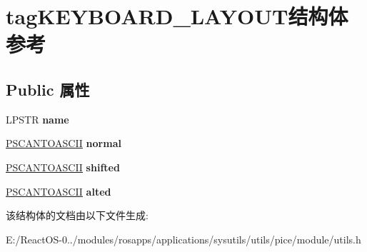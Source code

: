 \hypertarget{structtag_k_e_y_b_o_a_r_d___l_a_y_o_u_t}{}\section{tag\+K\+E\+Y\+B\+O\+A\+R\+D\+\_\+\+L\+A\+Y\+O\+U\+T结构体 参考}
\label{structtag_k_e_y_b_o_a_r_d___l_a_y_o_u_t}
\subsection*{Public 属性}
\begin{DoxyCompactItemize}
\item 
\mbox{\label{structtag_k_e_y_b_o_a_r_d___l_a_y_o_u_t_ae5dcc1bc256ba34119ef6e55fdb28c57}} 
L\+P\+S\+TR {\bfseries name}
\item 
\mbox{\label{structtag_k_e_y_b_o_a_r_d___l_a_y_o_u_t_a4ed09ce1cbf446a39967b62d6a369895}} 
\hyperlink{struct___s_c_a_n_t_o_a_s_c_i_i}{P\+S\+C\+A\+N\+T\+O\+A\+S\+C\+II} {\bfseries normal}
\item 
\mbox{\label{structtag_k_e_y_b_o_a_r_d___l_a_y_o_u_t_ade0e8a4447bdb5e450e2943c3a2db3a4}} 
\hyperlink{struct___s_c_a_n_t_o_a_s_c_i_i}{P\+S\+C\+A\+N\+T\+O\+A\+S\+C\+II} {\bfseries shifted}
\item 
\mbox{\label{structtag_k_e_y_b_o_a_r_d___l_a_y_o_u_t_a7fea4484526b2665b7ca98e576ac7d38}} 
\hyperlink{struct___s_c_a_n_t_o_a_s_c_i_i}{P\+S\+C\+A\+N\+T\+O\+A\+S\+C\+II} {\bfseries alted}
\end{DoxyCompactItemize}


该结构体的文档由以下文件生成\+:\begin{DoxyCompactItemize}
\item 
E\+:/\+React\+O\+S-\/0../modules/rosapps/applications/sysutils/utils/pice/module/utils.\+h\end{DoxyCompactItemize}
